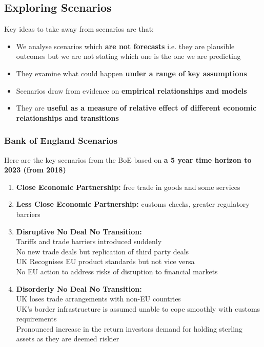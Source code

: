\documentclass[12pt, letterpaper]{article}
\begin{document}
\subsection{Exploring Scenarios}
Key ideas to take away from scenarios are that:
\begin{itemize}
	\item We analyse scenarios which \textbf{are not forecasts} i.e. they are plausible outcomes but we are not stating which one is the one we are predicting
	\item They examine what could happen \textbf{under a range of key assumptions}
	\item Scenarios draw from evidence on \textbf{empirical relationships and models}
	\item They are \textbf{useful as a measure of relative effect of different economic relationships and transitions}
\end{itemize}

\subsubsection{Bank of England Scenarios}
Here are the key scenarios from the BoE based on \textbf{a 5 year time horizon to 2023 (from 2018)}
\begin{enumerate}
	\item \textbf{Close Economic Partnership:} free trade in goods and some services
	\item \textbf{Less Close Economic Partnership:} customs checks, greater regulatory barriers
	\item \textbf{Disruptive No Deal No Transition:}\\ 
		Tariffs and trade barriers introduced suddenly\\
		No new trade deals but replication of third party deals\\
		UK Recognises EU product standards but not vice versa\\
		No EU action to address risks of disruption to financial markets
	\item \textbf{Disorderly No Deal No Transition:}\\
		UK loses trade arrangements with non-EU countries\\
		UK's border infrastructure is assumed unable to cope smoothly with customs requirements\\
		Pronounced increase in the return investors demand for holding sterling assets as they are deemed riskier
\end{enumerate}
\end{document}
